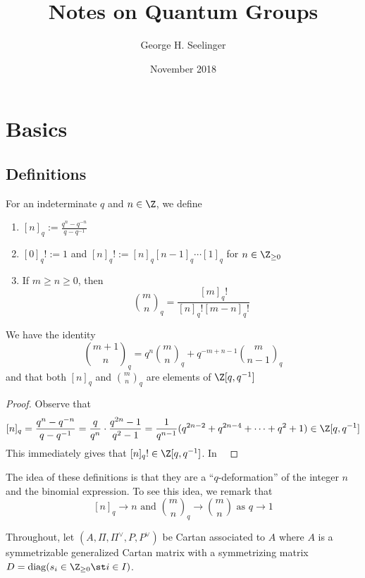 \documentclass[11pt,leqno,oneside]{amsart}
\title[Notes on Quantum Groups]{Notes on Quantum Groups}
\author{George H. Seelinger}
\date{November 2018}
\numberwithin{thm}{section}
\newcommand{\weightlattice}{P}
\renewcommand{\simpleroots}{\Pi}
\newcommand{\qfactorial}[1]{[#1]_q!}
\newcommand{\qbinom}[3][q]{\binom{#2}{#3}_{#1}}
\DeclareMathOperator{\diag}{diag}
\begin{document}
\maketitle
\section{Basics}
\subsection{Definitions}
\begin{defn}
  For an indeterminate \(q\) and \(n \in \Z\), we define
  \begin{enumerate}
  \item \([n]_q := \frac{q^n-q^{-n}}{q-q^{-1}}\)
  \item \(\qfactorial{0} := 1\) and \(\qfactorial{n} := [n]_q [n-1]_q
    \cdots [1]_q\) for \(n \in \Z_{\geq 0}\)
  \item If \(m \geq n \geq 0\), then \[
      \qbinom{m}{n} = \frac{\qfactorial{m}}{\qfactorial{n}\qfactorial{m-n}}
    \]
  \end{enumerate}
\end{defn}
\begin{prop}
  We have the identity \[
    \qbinom{m+1}{n} = q^n \qbinom{m}{n} + q^{-m+n-1} \qbinom{m}{n-1}
  \]
  and that both \([n]_q\) and \(\qbinom{m}{n}\) are elements of
  \(\Z[q,q^{-1}]\) 
\end{prop}
\begin{proof}
  Observe that \[
    [n]_q = \frac{q^n-q^{-n}}{q-q^{-1}} = \frac{q}{q^n}\cdot
    \frac{q^{2n}-1}{q^2-1} =
    \frac{1}{q^{n-1}}(q^{2n-2}+q^{2n-4}+\cdots+q^2+1) \in \Z[q,q^{-1}]
  \]
  This immediately gives that \(\qfactorial{n} \in \Z[q,q^{-1}]\). In \
\end{proof}
The idea of these definitions is that they are a ``\(q\)-deformation''
of the integer \(n\) and the binomial expression. To see this idea,
we remark that \[
  [n]_q \to n \text{ and }\qbinom{m}{n} \to \binom{m}{n} \text{ as }q
  \to 1
\]
\begin{defn}
  Throughout, let \((A, \simpleroots, \simpleroots^\vee,
  \weightlattice, 
  \weightlattice^\vee)\) be Cartan associated to \(A\) where \(A\) is
  a symmetrizable generalized Cartan matrix with a symmetrizing matrix
  \(D = \diag(s_i \in \Z_{\geq 0} \st i \in I)\).
\end{defn}
\end{document}
